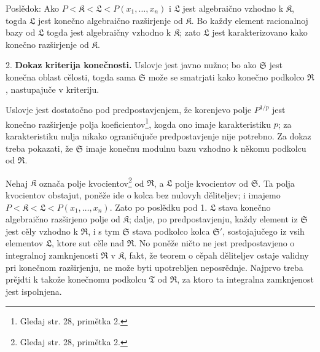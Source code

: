 \documentclass[11pt]{article}
\begin{document}
Poslědok: Ako $P<\mathfrak K<\mathfrak L<P(x_1,\ldots,x_n)$ i $\mathfrak L$ jest algebraično vzhodno k $\mathfrak K$, togda $\mathfrak L$ jest konečno algebraično razširjenje od $\mathfrak K$. Bo každy element racionalnoj bazy od $\mathfrak L$ togda jest algebraičny vzhodno k $\mathfrak K$; zato $\mathfrak L$ jest karakterizovano kako konečno razširjenje od $\mathfrak K$.

2. \textbf{Dokaz kriterija konečnosti.} Uslovje jest javno nužno; bo ako $\mathfrak S$ jest konečna oblast cělosti, togda sama $\mathfrak S$ može se smatrjati kako konečno podkolco $\mathfrak R$, nastupajuče v kriteriju.

Uslovje jest dostatočno pod predpostavjenjem, že korenjevo polje $P^{1/p}$ jest konečno razširjenje polja koeficientov\footnote{Gledaj str. 28, primětka 2.}, kogda ono imaje karakteristiku $p$; za karakteristiku nulja nikako ograničujuče predpostavjenje nije potrebno. Za dokaz treba pokazati, že $\mathfrak S$ imaje konečnu modulnu bazu vzhodno k někomu podkolcu od $\mathfrak R$.

Nehaj $\mathfrak K$ označa polje kvocientov\footnote{Gledaj str. 28, primětka 2.} od $\mathfrak R$, a $\mathfrak L$ polje kvocientov od $\mathfrak S$. Ta polja kvocientov obstajut, poněže ide o kolca bez nulovyh děliteljev; i imajemo $P<\mathfrak K<\mathfrak L<P(x_1,\ldots,x_n)$. Zato po poslědku pod 1. $\mathfrak L$ stava konečno algebraično razširjeno polje od $\mathfrak K$; dalje, po predpostavjenju, každy element iz $\mathfrak S$ jest cěly vzhodno k $\mathfrak R$, i s tym $\mathfrak S$ stava podkolco kolca $\mathfrak S'$, sostojajučego iz vsih elementov $\mathfrak L$, ktore sut cěle nad $\mathfrak R$. No poněže ničto ne jest predpostavjeno o integralnoj zamknjenosti $\mathfrak R$ v $\mathfrak K$, fakt, že teorem o cěpah děliteljev ostaje validny pri konečnom razširjenju, ne može byti upotrebljen neposrědnje. Najprvo treba prějdti k takože konečnomu podkolcu $\mathfrak T$ od $\mathfrak R$, za ktoro ta integralna zamknjenost jest ispolnjena.
\end{document}
